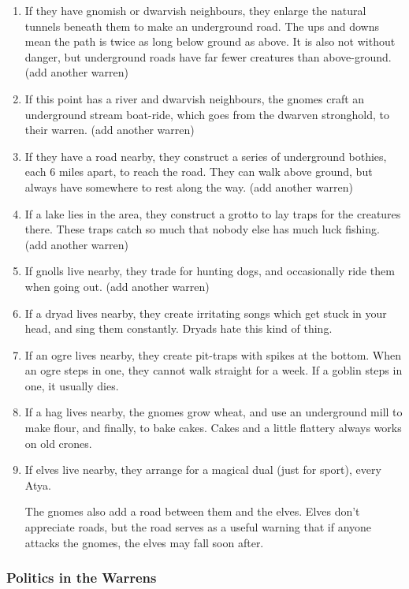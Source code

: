 \begin{multicols}{2}
\begin{enumerate}
  \item
  If they have gnomish or dwarvish neighbours, they enlarge the natural tunnels beneath them to make an underground road. The ups and downs mean the path is twice as long below ground as above.  It is also not without danger, but underground roads have far fewer creatures than above-ground. (add another warren)
  \item
  If this point has a river and dwarvish neighbours, the gnomes craft an underground stream boat-ride, which goes from the dwarven stronghold, to their warren. (add another warren)
  \item
  If they have a road nearby, they construct a series of underground bothies, each 6 miles apart, to reach the road.  They can walk above ground, but always have somewhere to rest along the way. (add another warren)
  \item
  If a lake lies in the area, they construct a grotto to lay traps for the creatures there.  These traps catch so much that nobody else has much luck fishing. (add another warren)
  \item
  If gnolls live nearby, they trade for hunting dogs, and occasionally ride them when going out. (add another warren)
  \item
  If a dryad lives nearby, they create irritating songs which get stuck in your head, and sing them constantly.  Dryads hate this kind of thing.
  \item
  If an ogre lives nearby, they create pit-traps with spikes at the bottom.  When an ogre steps in one, they cannot walk straight for a week.  If a goblin steps in one, it usually dies.
  \item
  If a hag lives nearby, the gnomes grow wheat, and use an underground mill to make flour, and finally, to bake cakes.  Cakes and a little flattery always works on old crones.
  \item
  If elves live nearby, they arrange for a magical dual (just for sport), every \gls{Atya}.

  The gnomes also add a road between them and the elves.
  Elves don't appreciate roads, but the road serves as a useful warning that if anyone attacks the gnomes, the elves may fall soon after.
\end{enumerate}

\subsubsection{Politics in the Warrens}


\end{multicols}
